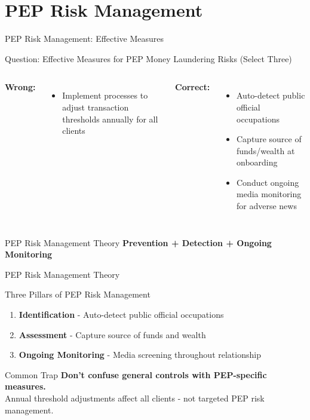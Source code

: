 \documentclass{beamer}
\begin{document}
\section{PEP Risk Management}
\begin{frame}{PEP Risk Management: Effective Measures}
\begin{block}{Question: Effective Measures for PEP Money Laundering Risks (Select Three)}
\end{block}

\begin{columns}
\textcolor{wrong}{\textbf{ Wrong:}}
\begin{itemize}
    \item Implement processes to adjust transaction thresholds annually for all clients
\end{itemize}

\textcolor{correct}{\textbf{Correct:}}
\begin{itemize}
    \item Auto-detect public official occupations
    \item Capture source of funds/wealth at onboarding
    \item Conduct ongoing media monitoring for adverse news
\end{itemize}
\end{columns}

\begin{block}{PEP Risk Management Theory}
\textbf{Prevention + Detection + Ongoing Monitoring}
\end{block}
\end{frame}

\begin{frame}{PEP Risk Management Theory}
\begin{block}{Three Pillars of PEP Risk Management}
\begin{enumerate}
    \item \textbf{Identification} - Auto-detect public official occupations
    \item \textbf{Assessment} - Capture source of funds and wealth
    \item \textbf{Ongoing Monitoring} - Media screening throughout relationship
\end{enumerate}
\end{block}

\begin{alertblock}{Common Trap}
\textbf{Don't confuse general controls with PEP-specific measures.} \\
Annual threshold adjustments affect all clients - not targeted PEP risk management.
\end{alertblock}
\end{frame}
\end{document}
